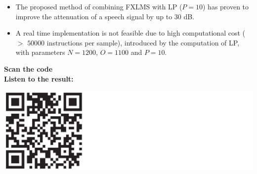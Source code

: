 \large
\begin{itemize}
	\item The proposed method of combining FXLMS with LP ($P=10$) has proven to improve the attenuation of a speech signal by up to 30 dB. \\
	\item A real time implementation is not feasible due to high computational cost ($>$ $50000$ instructions per sample), introduced by the computation of LP, with parameters $N=1200$, $O=1100$ and $P=10$. \\
\end{itemize}
\vspace{-5mm}
 \begin{minipage}{.8\columnwidth}
 	\begin{center}
	 	\textbf {\Large {\textcolor{aaublue1}{Scan the code}}}\\
	 	\textbf{\textcolor{aaublue1}{Listen to the result:}}
 	\end{center}
 \end{minipage}%
 \begin{minipage}{0.2\columnwidth}
 	\includegraphics[width=2.5\textwidth]{figures/QRCODE.pdf}
 \end{minipage}